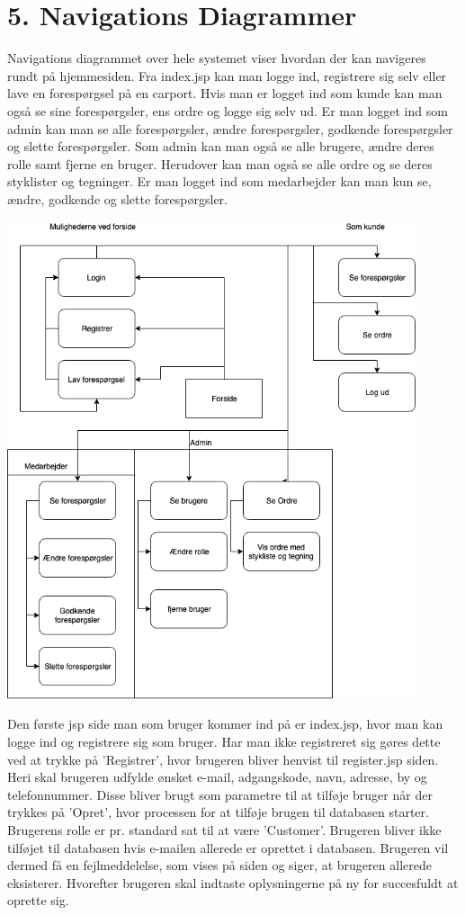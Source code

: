 \documentclass[11pt]{report}
\begin{document}
\chapter*{5. Navigations Diagrammer}
Navigations diagrammet over hele systemet viser hvordan der kan navigeres rundt på hjemmesiden. Fra index.jsp kan man logge ind, registrere sig selv eller lave en forespørgsel på en carport. Hvis man er logget ind som kunde kan man også se sine forespørgsler, ens ordre og logge sig selv ud. Er man logget ind som admin kan man se alle forespørgsler, ændre forespørgsler, godkende forespørgsler og slette forespørgsler. Som admin kan man også se alle brugere, ændre deres rolle samt fjerne en bruger. Herudover kan man også se alle ordre og se deres styklister og tegninger. Er man logget ind som medarbejder kan man kun se, ændre, godkende og slette forespørgsler. \\
\begin{center}
\includegraphics[width=12cm]{Overordnet.png}
\end{center}
Den første jsp side man som bruger kommer ind på er index.jsp, hvor man kan logge ind og registrere sig som bruger.
Har man ikke registreret sig gøres dette ved at trykke på ’Registrer’, hvor brugeren bliver henvist til register.jsp siden. Heri skal brugeren udfylde ønsket e-mail, adgangskode, navn, adresse, by og telefonnummer. Disse bliver brugt som parametre til at tilføje bruger når der trykkes på ’Opret’, hvor processen for at tilføje brugen til databasen starter. Brugerens rolle er pr. standard sat til at være ’Customer’. Brugeren bliver ikke tilføjet til databasen hvis e-mailen allerede er oprettet i databasen. Brugeren vil dermed få en fejlmeddelelse, som vises på siden og siger, at brugeren allerede eksisterer. Hvorefter brugeren skal indtaste oplysningerne på ny for succesfuldt at oprette sig.
\end{document}
